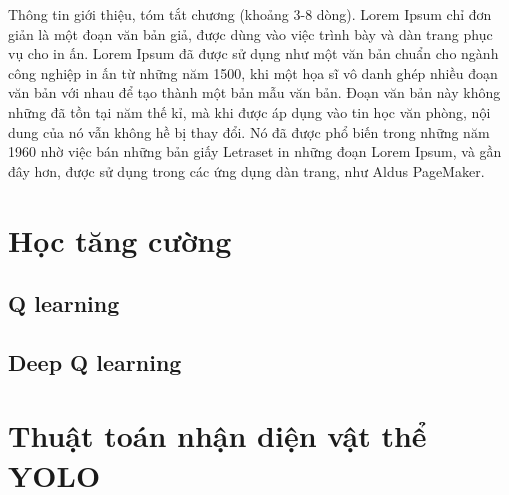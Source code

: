 Thông tin giới thiệu, tóm tắt chương (khoảng 3-8 dòng). Lorem Ipsum chỉ đơn giản là một đoạn văn bản giả, được dùng vào việc trình bày và dàn trang phục vụ cho in ấn. Lorem Ipsum đã được sử dụng như một văn bản chuẩn cho ngành công nghiệp in ấn từ những năm 1500, khi một họa sĩ vô danh ghép nhiều đoạn văn bản với nhau để tạo thành một bản mẫu văn bản. Đoạn văn bản này không những đã tồn tại năm thế kỉ, mà khi được áp dụng vào tin học văn phòng, nội dung của nó vẫn không hề bị thay đổi. Nó đã được phổ biến trong những năm 1960 nhờ việc bán những bản giấy Letraset in những đoạn Lorem Ipsum, và gần đây hơn, được sử dụng trong các ứng dụng dàn trang, như Aldus PageMaker.

\section{Học tăng cường}
\subsection{Q learning}
\subsection{Deep Q learning}

\section{Thuật toán nhận diện vật thể YOLO}

